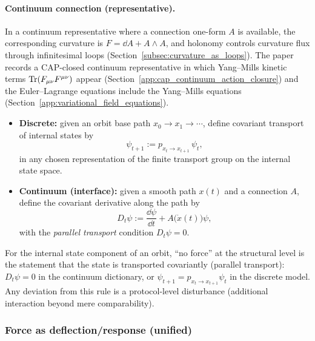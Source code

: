 \paragraph{Continuum connection (representative).}
\InterfaceTag In a continuum representative where a connection one-form $A$ is available, the corresponding curvature is $F=\dd A + A\wedge A$, and holonomy controls curvature flux through infinitesimal loops (Section~\ref{subsec:curvature_as_loops}).
The paper records a CAP-closed continuum representative in which Yang--Mills kinetic terms $\mathrm{Tr}(F_{\mu\nu}F^{\mu\nu})$ appear (Section~\ref{app:cap_continuum_action_closure}) and the Euler--Lagrange equations include the Yang--Mills equations (Section~\ref{app:variational_field_equations}).

\begin{definition}
\label{def:covariant_transport_along_orbit}
\begin{itemize}
\item \textbf{Discrete:} given an orbit base path $x_0\to x_1\to\cdots$, define covariant transport of internal states by
\[
\psi_{t+1} := p_{x_t\to x_{t+1}}\,\psi_t,
\]
in any chosen representation of the finite transport group on the internal state space.
\item \textbf{Continuum (interface):} given a smooth path $x(t)$ and a connection $A$, define the covariant derivative along the path by
\[
D_t\psi := \frac{\dd\psi}{\dd t} + A\bigl(\dot x(t)\bigr)\psi,
\]
with the \emph{parallel transport} condition $D_t\psi=0$.
\end{itemize}
\end{definition}

\begin{proposition}
\label{prop:gauge_defines_no_force_transport}
\InterfaceTag For the internal state component of an orbit, ``no force'' at the structural level is the statement that the state is transported covariantly (parallel transport): $D_t\psi=0$ in the continuum dictionary, or $\psi_{t+1}=p_{x_t\to x_{t+1}}\psi_t$ in the discrete model.
Any deviation from this rule is a protocol-level disturbance (additional interaction beyond mere comparability).
\end{proposition}

\subsubsection{Force as deflection/response (unified)}
